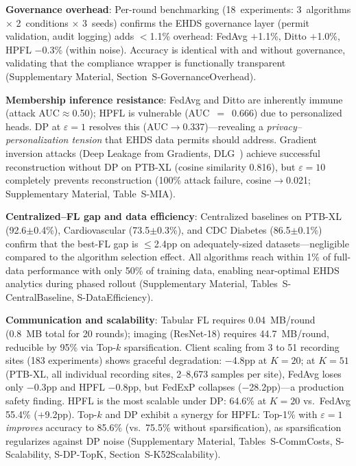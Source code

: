 \documentclass[conference]{IEEEtran}
\begin{document}
\textbf{Governance overhead}: Per-round benchmarking (18~experiments: 3~algorithms $\times$ 2~conditions $\times$ 3~seeds) confirms the EHDS governance layer (permit validation, audit logging) adds $<$1.1\% overhead: FedAvg $+$1.1\%, Ditto $+$1.0\%, HPFL $-$0.3\% (within noise). Accuracy is identical with and without governance, validating that the compliance wrapper is functionally transparent (Supplementary Material, Section~S-GovernanceOverhead).

\textbf{Membership inference resistance}: FedAvg and Ditto are inherently immune (attack AUC$\approx$0.50); HPFL is vulnerable (AUC~$=$~0.666) due to personalized heads. DP at $\varepsilon{=}1$ resolves this (AUC$\to$0.337)---revealing a \textit{privacy--personalization tension} that EHDS data permits should address. Gradient inversion attacks (Deep Leakage from Gradients, DLG~\cite{zhu2019deep}) achieve successful reconstruction without DP on PTB-XL (cosine similarity 0.816), but $\varepsilon{=}10$ completely prevents reconstruction (100\% attack failure, cosine$\to$0.021; Supplementary Material, Table~S-MIA).

\textbf{Centralized--FL gap and data efficiency}: Centralized baselines on PTB-XL (92.6$\pm$0.4\%), Cardiovascular (73.5$\pm$0.3\%), and CDC Diabetes (86.5$\pm$0.1\%) confirm that the best-FL gap is $\leq$2.4pp on adequately-sized datasets---negligible compared to the algorithm selection effect. All algorithms reach within 1\% of full-data performance with only 50\% of training data, enabling near-optimal EHDS analytics during phased rollout (Supplementary Material, Tables~S-CentralBaseline, S-DataEfficiency).

\textbf{Communication and scalability}: Tabular FL requires 0.04~MB/round (0.8~MB total for 20 rounds); imaging (ResNet-18) requires 44.7~MB/round, reducible by 95\% via Top-$k$ sparsification. Client scaling from 3 to 51 recording sites (183 experiments) shows graceful degradation: $-$4.8pp at $K{=}20$; at $K{=}51$ (PTB-XL, all individual recording sites, 2--8,673 samples per site), FedAvg loses only $-$0.3pp and HPFL $-$0.8pp, but FedExP collapses ($-$28.2pp)---a production safety finding. HPFL is the most scalable under DP: 64.6\% at $K{=}20$ vs.\ FedAvg 55.4\% ($+$9.2pp). Top-$k$ and DP exhibit a synergy for HPFL: Top-1\% with $\varepsilon{=}1$ \textit{improves} accuracy to 85.6\% (vs.\ 75.5\% without sparsification), as sparsification regularizes against DP noise (Supplementary Material, Tables~S-CommCosts, S-Scalability, S-DP-TopK, Section~S-K52Scalability).
\end{document}
